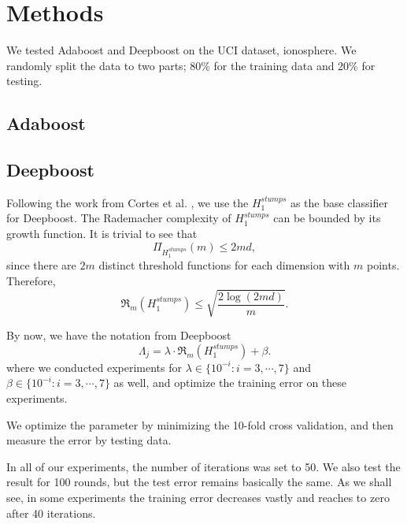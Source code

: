 \section{Methods}
We tested Adaboost and Deepboost on the UCI dataset, ionosphere\cite{Lichman2013}. We randomly split the data to two parts; 80\% for the training data and 20\% for testing.
\subsection{Adaboost}

\subsection{Deepboost}
Following the work from Cortes et al. \cite{cortes2014deep}, we use the $H_1^{stumps}$ as the base classifier for Deepboost.
The Rademacher complexity of $H_1^{stumps}$ can be bounded by its growth function.
It is trivial to see that
\[\Pi_{H_1^{stumps}}(m) \leq 2md,\]
since there are $2m$ distinct threshold functions for each dimension with $m$ points. Therefore,
\[\mathfrak{R}_m (H_1^{stumps})\leq \sqrt{\frac{2\log (2md)}{m}}.\]

By now, we have the notation from Deepboost
\[\Lambda_j=\lambda\cdot\mathfrak{R}_m (H_1^{stumps}) +\beta.\]
where we conducted experiments for $\lambda \in \{10^{-i}:i=3,\cdots, 7\}$ and $\beta \in \{10^{-i}:i=3,\cdots, 7\}$ as well, and optimize the training error on these experiments.

We optimize the parameter by minimizing the 10-fold cross validation, and then measure the error by testing data.

In all of our experiments, the number of iterations was set to 50. We also test the result for 100 rounds, but the test error remains basically the same.
As we shall see, in some experiments the training error decreases vastly and reaches to zero after 40 iterations.

